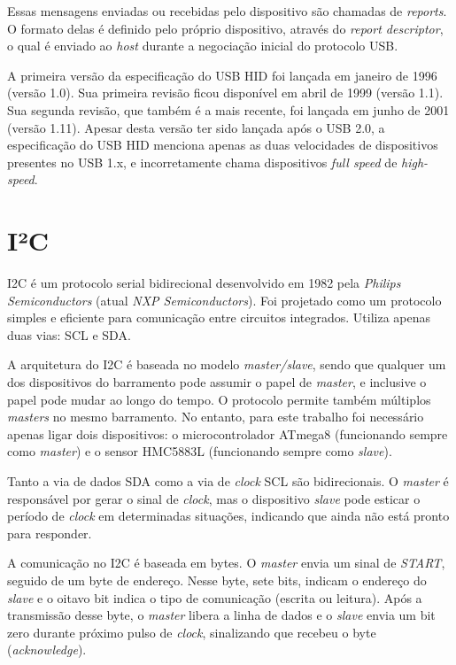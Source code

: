 \documentclass[brazil,pagestart=firstchapter]{abnt}
\begin{document}
Essas mensagens enviadas ou recebidas pelo dispositivo são chamadas de
\textit{reports}. O formato delas é definido pelo próprio dispositivo,
através do \textit{report descriptor}, o qual é enviado ao \textit{host}
durante a negociação inicial do protocolo \ac{USB}. \cite{usbhid}

A primeira versão da especificação do \ac{USB} \ac{HID} foi lançada em
janeiro de 1996 (versão 1.0). Sua primeira revisão ficou disponível em abril
de 1999 (versão 1.1). Sua segunda revisão, que também é a mais recente, foi
lançada em junho de 2001 (versão 1.11). Apesar desta versão ter sido lançada
após o \ac{USB} 2.0, a especificação do \ac{USB} \ac{HID} menciona apenas as
duas velocidades de dispositivos presentes no \ac{USB} 1.x, e incorretamente
chama dispositivos \textit{full speed} de \textit{high-speed}.
\cite{usbhid}


\section{I²C}
\label{sec:i2c}

\ac{I2C} é um protocolo serial bidirecional desenvolvido em 1982 pela
\textit{Philips Semiconductors} (atual \textit{NXP Semiconductors}). Foi
projetado como um protocolo simples e eficiente para comunicação entre
circuitos integrados. Utiliza apenas duas vias: \ac{SCL} e \ac{SDA}.
\cite{UM10204}

A arquitetura do \ac{I2C} é baseada no modelo \textit{master/slave}, sendo
que qualquer um dos dispositivos do barramento pode assumir o papel de
\textit{master}, e inclusive o papel pode mudar ao longo do tempo. O
protocolo permite também múltiplos \textit{masters} no mesmo barramento.
\cite[p.~6]{UM10204} \cite[p.~161]{ATmega8} No entanto, para este trabalho
foi necessário apenas ligar dois dispositivos: o microcontrolador ATmega8
(funcionando sempre como \textit{master}) e o sensor HMC5883L (funcionando
sempre como \textit{slave}).

Tanto a via de dados \ac{SDA} como a via de \textit{clock} \ac{SCL} são
bidirecionais. O \textit{master} é responsável por gerar o sinal de
\textit{clock}, mas o dispositivo \textit{slave} pode esticar o período de
\textit{clock} em determinadas situações, indicando que ainda não está
pronto para responder. \cite[p.~13]{UM10204}

A comunicação no \ac{I2C} é baseada em bytes. O \textit{master} envia um
sinal de \textit{START}, seguido de um byte de endereço. Nesse byte, sete
bits, indicam o endereço do \textit{slave} e o oitavo bit indica o tipo de
comunicação (escrita ou leitura). Após a transmissão desse byte, o
\textit{master} libera a linha de dados e o \textit{slave} envia um bit zero
durante próximo pulso de \textit{clock}, sinalizando que recebeu o byte
(\textit{acknowledge}). \cite[p.~3]{AVR315}
\end{document}
